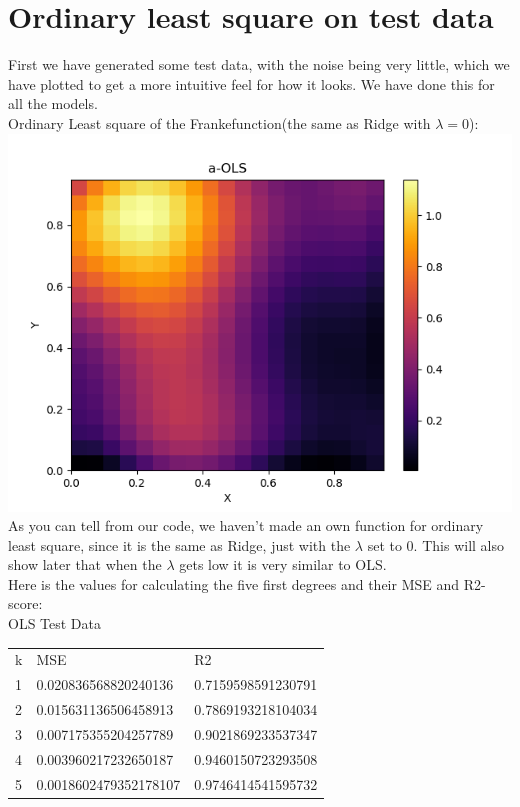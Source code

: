 \documentclass[a4paper,norsk]{article}
\begin{document}
\section*{Ordinary least square on test data}
First we have generated some test data, with the noise being very little, which we have plotted to get a more intuitive feel for how it looks. We have done this for all the models.
\\Ordinary Least square of the Frankefunction(the same as Ridge with $\lambda=0$):
\\ \includegraphics[scale=.7]{a-OLS}
\\As you can tell from our code, we haven't made an own function for ordinary least square, since it is the same as Ridge, just with the $\lambda$ set to 0. This will also show later that when the $\lambda$ gets low it is very similar to OLS.
\\Here is the values for calculating the five first degrees and their MSE and  R2-score:
\\OLS Test Data
\begin{table}[!h]
\begin{tabular}{lll}
k & MSE                   & R2                 \\
1 & 0.020836568820240136  & 0.7159598591230791 \\
2 & 0.015631136506458913  & 0.7869193218104034 \\
3 & 0.007175355204257789  & 0.9021869233537347 \\
4 & 0.003960217232650187  & 0.9460150723293508 \\
5 & 0.0018602479352178107 & 0.9746414541595732
\end{tabular}
\end{table}
\end{document}
